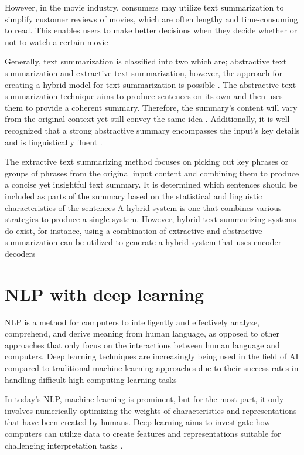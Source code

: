 \documentclass[manuscript,screen,natbib=false]{acmart}
\begin{document}
However, in the movie industry, consumers may utilize text summarization to simplify customer reviews of movies, which are often lengthy and time-consuming to read. This enables users to make better decisions when they decide whether or not to watch a certain movie \cite{khan_gul_zareei_biswal_zeb_naeem_saeed_salim_2020}

Generally, text summarization is classified into two which are; abstractive text summarization and extractive text summarization, however, the approach for creating a hybrid model for text summarization is possible \cite{alsaqer_sasi_2017}. The abstractive text summarization technique aims to produce sentences on its own and then uses them to provide a coherent summary. Therefore, the summary's content will vary from the original context yet still convey the same idea \cite{duseja_2020}. Additionally, it is well-recognized that a strong abstractive summary encompasses the input's key details and is linguistically fluent \cite{zhang_xu_wang_2019}.

The extractive text summarizing method focuses on picking out key phrases or groups of phrases from the original input content and combining them to produce a concise yet insightful text summary. It is determined which sentences should be included as parts of the summary based on the statistical and linguistic characteristics of the sentences \cite{gupta_lehal_2010}
A hybrid system is one that combines various strategies to produce a single system. However, hybrid text summarizing systems do exist, for instance, using a combination of extractive and abstractive summarization can be utilized to generate a hybrid system that uses encoder-decoders \cite{kirmani_manzoor}

\section{NLP with deep learning}
NLP is a method for computers to intelligently and effectively analyze, comprehend, and derive meaning from human language, as opposed to other approaches that only focus on the interactions between human language and computers. Deep learning techniques are increasingly being used in the field of AI compared to traditional machine learning approaches due to their success rates in handling difficult high-computing learning tasks \cite{lopez_kalita_2017}

In today's NLP, machine learning is prominent, but for the most part, it only involves numerically optimizing the weights of characteristics and representations that have been created by humans. Deep learning aims to investigate how computers can utilize data to create features and representations suitable for challenging interpretation tasks \cite{socher_bengio_manning}.
\end{document}
